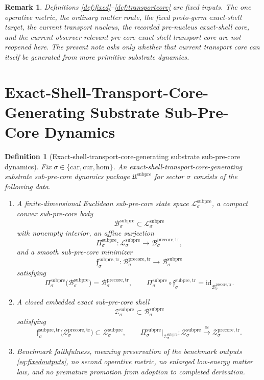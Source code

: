 \documentclass[11pt]{article}
\newcommand{\Car}{\mathrm{car}}
\newcommand{\Cur}{\mathrm{cur}}
\newcommand{\Hom}{\mathrm{hom}}
\newcommand{\PreCoreTrBody}[1]{\mathcal B_{#1}^{\mathrm{precore,tr}}}
\newcommand{\PreCoreTrShell}[1]{\mathcal Z_{#1}^{\mathrm{precore,tr}}}
\newcommand{\SubPreCorePackage}{\mathfrak U^{\mathrm{subpre}}}
\newcommand{\SubPreCoreSpace}[1]{\mathcal L_{#1}^{\mathrm{subpre}}}
\newcommand{\SubPreCoreBody}[1]{\mathcal B_{#1}^{\mathrm{subpre}}}
\newcommand{\SubPreCoreProj}[1]{\Pi_{#1}^{\mathrm{subpre}}}
\newcommand{\SubPreCoreTransportMin}[1]{\mathfrak f_{#1}^{\mathrm{subpre,tr}}}
\newcommand{\SubPreCoreShellSet}[1]{\mathcal Z_{#1}^{\mathrm{subpre}}}
\newtheorem{definition}{Definition}
\newtheorem{remark}{Remark}
\begin{document}
\begin{remark}
Definitions \ref{def:fixed}--\ref{def:transportcore} are fixed inputs. The one operative metric, the ordinary matter route, the fixed proto-germ exact-shell target, the current transport nucleus, the recorded pre-nucleus exact-shell core, and the current observer-relevant pre-core exact-shell transport core are not reopened here. The present note asks only whether that current transport core can itself be generated from more primitive substrate dynamics.
\end{remark}

\section{Exact-Shell-Transport-Core-Generating Substrate Sub-Pre-Core Dynamics}

\begin{definition}[Exact-shell-transport-core-generating substrate sub-pre-core dynamics]
\label{def:subpre}
Fix \(\sigma\in\{\Car,\Cur,\Hom\}\). An \emph{exact-shell-transport-core-generating substrate sub-pre-core dynamics package} \(\SubPreCorePackage\) for sector \(\sigma\) consists of the following data.
\begin{enumerate}
    \item A finite-dimensional Euclidean sub-pre-core state space \(\SubPreCoreSpace{\sigma}\), a compact convex sub-pre-core body
    \[
    \SubPreCoreBody{\sigma}\subset\SubPreCoreSpace{\sigma}
    \]
    with nonempty interior, an affine surjection
    \[
    \SubPreCoreProj{\sigma}:\SubPreCoreSpace{\sigma}\to\PreCoreTrBody{\sigma},
    \]
    and a smooth sub-pre-core minimizer
    \[
    \SubPreCoreTransportMin{\sigma}:\PreCoreTrBody{\sigma}\to\SubPreCoreBody{\sigma}
    \]
    satisfying
    \[
    \SubPreCoreProj{\sigma}\bigl(\SubPreCoreBody{\sigma}\bigr)=\PreCoreTrBody{\sigma},
    \qquad
    \SubPreCoreProj{\sigma}\circ\SubPreCoreTransportMin{\sigma}
    =
    \mathrm{id}_{\PreCoreTrBody{\sigma}}.
    \]
    \item A closed embedded exact sub-pre-core shell
    \[
    \SubPreCoreShellSet{\sigma}\subset\SubPreCoreBody{\sigma}
    \]
    satisfying
    \[
    \SubPreCoreTransportMin{\sigma}\bigl(\PreCoreTrShell{\sigma}\bigr)
    \subset
    \SubPreCoreShellSet{\sigma},
    \qquad
    \SubPreCoreProj{\sigma}\big|_{\SubPreCoreShellSet{\sigma}}
    :
    \SubPreCoreShellSet{\sigma}
    \xrightarrow{\cong}
    \PreCoreTrShell{\sigma}.
    \]
    \item Benchmark faithfulness, meaning preservation of the benchmark outputs \eqref{eq:fixedoutputs}, no second operative metric, no enlarged low-energy matter law, and no premature promotion from adoption to completed derivation.
\end{enumerate}
\end{definition}
\end{document}
